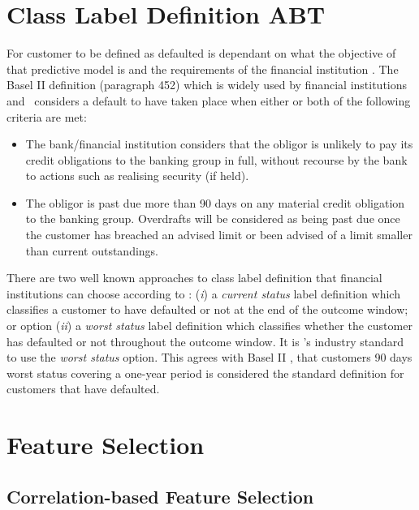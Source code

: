 \section{Class Label Definition ABT} \label{classLabelDef}
For customer to be defined as defaulted is dependant on what the objective of that predictive model is and the requirements of the financial institution \citep{mcnab_principles_2000}. The Basel II definition (paragraph 452) which is widely used by financial institutions and \subjectname\ considers a default to have taken place when either or both of the following criteria are met:
\vspace{-3mm} 
\begin{itemize}
	\item The bank/financial institution considers that the obligor is unlikely to pay its credit obligations to the banking group in full, without recourse by the bank to actions such as realising security (if held).
	\item The obligor is past due more than 90 days on any material credit obligation to the banking group. Overdrafts will be considered as being past due once the customer has breached an advised limit or been advised of a limit smaller than current outstandings.
\end{itemize} 

There are two well known approaches to class label definition that financial institutions can choose according to \cite{anderson_credit_2007}: (\textit{i}) a \textit{current status} label definition which classifies a customer to have defaulted or not at the end of the outcome window; or option (\textit{ii}) a \textit{worst status} label definition which classifies whether the customer has defaulted or not throughout the outcome window. It is \subjectname's industry standard to use the \textit{worst status} option. This agrees with Basel II \citep{basel_international_2006}, that customers 90 days worst status covering a one-year period is considered the standard definition for customers that have defaulted. 


\section{Feature Selection}
\subsection{Correlation-based Feature Selection}

